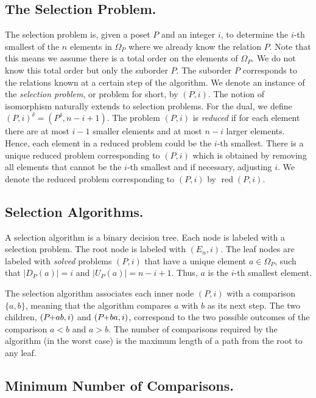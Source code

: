 \documentclass[a4paper,UKenglish,cleveref, autoref, thm-restate]{lipics-v2021}
\newcommand{\pchild}[3]{{#1}\kern-1pt{+}{#2}{#3}}
\newcommand{\dual}[1]{{#1}^{\delta}}
\newcommand{\reduced}[1]{\operatorname{red}#1}
\newcommand{\less}[2]{D_{#1}(#2)}
\newcommand{\greater}[2]{U_{#1}(#2)}
\begin{document}
\subsection{The Selection Problem.}
The selection problem is, given a poset $P$ and an integer $i$, to determine the $i$-th smallest of the $n$ elements in $\Omega_P$ where we already know the relation $P$.
Note that this means we assume there is a total order on the elements of $\Omega_P$.
We do not know this total order but only the suborder $P$.
The suborder $P$ corresponds to the relations known at a certain step of the algorithm.
We denote an instance of the \emph{selection problem}, or problem for short, by $(P, i)$.
The notion of isomorphism naturally extends to selection problems.
For the dual, we define $\dual{(P, i)} = (\dual{P}, n - i + 1)$.
The problem $(P, i)$ is \emph{reduced} if for each element there are at most $i - 1$ smaller elements and at most $n - i$ larger elements.
Hence, each element in a reduced problem could be the $i$-th smallest.
There is a unique reduced problem corresponding to $(P, i)$ which is obtained by removing all elements that cannot be the $i$-th smallest and if necessary, adjusting $i$.
We denote the reduced problem corresponding to $(P, i)$ by $\reduced{(P, i)}$.


\subsection{Selection Algorithms.}
A selection algorithm is a binary decision tree.
Each node is labeled with a selection problem.
The root node is labeled with $(E_n, i)$.
The leaf nodes are labeled with \emph{solved} problems $(P, i)$ that have a unique element $a \in \Omega_P$, such that $|\less{P}{a}| = i$ and $|\greater{P}{a}| = n - i + 1$.
Thus, $a$ is the $i$-th smallest element.

The selection algorithm associates each inner node $(P, i)$ with a comparison $\{a, b\}$, meaning that the algorithm compares $a$ with $b$ as its next step.
The two children, $(\pchild{P}{a}{b}, i)$ and $(\pchild{P}{b}{a}, i)$, correspond to the two possible outcomes of the comparison $a < b$ and $a > b$.
The number of comparisons required by the algorithm (in the worst case) is the maximum length of a path from the root to any leaf.


\subsection{Minimum Number of Comparisons.}
\end{document}
